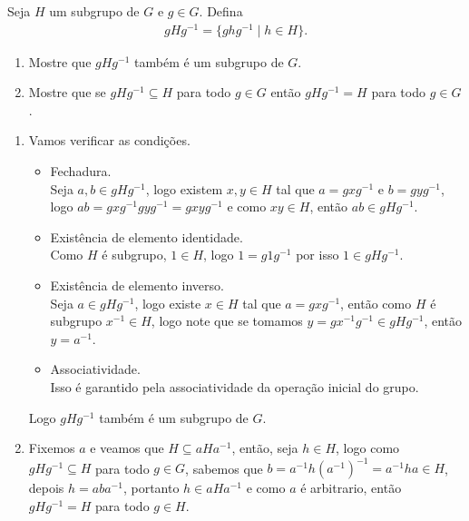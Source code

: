 \begin{homeworkProblem}
  Seja $H$ um subgrupo de $G$ e $g \in G$. Defina
  \begin{align*}
    gHg^{-1} = \{ ghg^{-1} \mid h \in H \}. 
  \end{align*}
  \begin{enumerate}
    \item Mostre que $gHg^{-1}$ também é um subgrupo de $G$.
    \item Mostre que se $gHg^{-1} \subseteq H$ para todo $g \in G$ então $gHg^{-1} = H$ para todo $g \in G$.
  \end{enumerate}
  \begin{solution}
    \begin{enumerate}
      \item Vamos verificar as condições.
      \begin{itemize}
        \item Fechadura.\\
          Seja $a,b\in gHg^{-1}$, logo existem $x,y\in H$ tal que $a=gxg^{-1}$ e $b=gyg^{-1}$, logo $ab=gxg^{-1}gyg^{-1}=gxyg^{-1}$ e como $xy\in H$, então $ab\in gHg^{-1}$.
        \item Existência de elemento identidade.\\
          Como $H$ é subgrupo, $1\in H$, logo $1=g1g^{-1}$ por isso $1\in gHg^{-1}$.
        \item Existência de elemento inverso.\\
          Seja $a\in gHg^{-1}$, logo existe $x\in H$ tal que $a=gxg^{-1}$, então como $H$ é subgrupo $x^{-1}\in H$, logo note que se tomamos $y=gx^{-1}g^{-1}\in gHg^{-1}$, então $y=a^{-1}$.
        \item Associatividade.\\
          Isso é garantido pela associatividade da operação inicial do grupo.
      \end{itemize}
      Logo $gHg^{-1}$ também é um subgrupo de $G$.
      \item Fixemos $a$ e veamos que $H\subseteq aHa^{-1}$, então, seja $h\in H$, logo como $gHg^{-1}\subseteq H$ para todo $g\in G$, sabemos que $b=a^{-1}h\left( a^{-1} \right)^{-1}=a^{-1}ha\in H$, depois $h=aba^{-1}$, portanto $h\in aHa^{-1}$ e como $a$ é arbitrario, então $gHg^{-1}=H$ para todo $g\in H$.  
    \end{enumerate}
  \end{solution}
\end{homeworkProblem}
